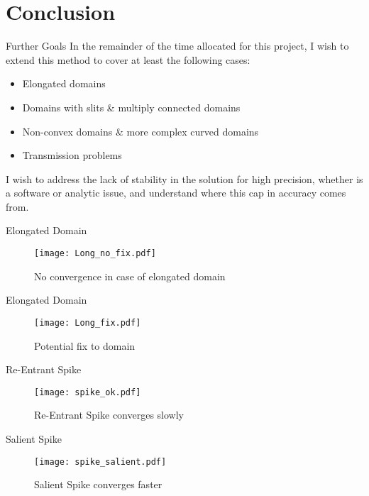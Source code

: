 \documentclass[envcountsect notes]{beamer}       %
\begin{document}
\section{Conclusion}
\begin{frame}{Further Goals}
    In the remainder of the time allocated for this project, I wish to extend this method to cover 
    at least the following cases:
    \begin{itemize}
        \item Elongated domains
        \item Domains with slits \& multiply connected domains
        \item Non-convex domains \& more complex curved domains
        \item Transmission problems
    \end{itemize}
    \vspace{1em}
    I wish to address the lack of stability in the solution for high precision, whether is a software or analytic issue, and understand where this cap in accuracy comes from.
\end{frame}


\begin{frame}{Elongated Domain}
    \begin{figure}[t]
        \vspace{-1em}
        \texttt{[image: Long\_no\_fix.pdf]}
        \vspace{-3em}
        \caption*{No convergence in case of elongated domain}
    \end{figure}
\end{frame}
\begin{frame}{Elongated Domain}
    \begin{figure}[t]
        \vspace{-1em}
        \texttt{[image: Long\_fix.pdf]}
        \vspace{-3em}
        \caption*{Potential fix to domain}
    \end{figure}
\end{frame}
\begin{frame}{Re-Entrant Spike}
    \begin{figure}[t]
        \vspace{-1em}
        \texttt{[image: spike\_ok.pdf]}
        \vspace{-3em}
        \caption*{Re-Entrant Spike converges slowly}
    \end{figure}
\end{frame}
\begin{frame}{Salient Spike}
    \begin{figure}[t]
        \vspace{-1em}
        \texttt{[image: spike\_salient.pdf]}
        \vspace{-3em}
        \caption*{Salient Spike converges faster}
    \end{figure}
\end{frame}
\end{document}
